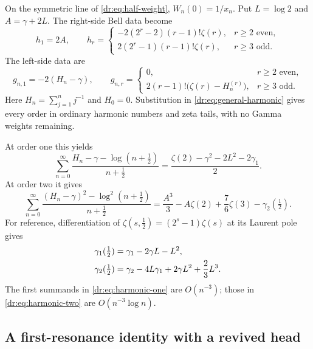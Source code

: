\documentclass[11pt,letterpaper]{article}
\numberwithin{equation}{section}
\theoremstyle{definition}
\theoremstyle{remark}
\begin{document}
On the symmetric line of \eqref{dr:eq:half-weight}, $W_n(0)=1/x_n$.
Put $L=\log2$ and $A=\gamma+2L$. The right-side Bell data become
\begin{equation}
 h_1=2A,\qquad
 h_r=\begin{cases}
 -2(2^r-2)(r-1)!\zeta(r),&r\geq2\text{ even},\\
  2(2^r-1)(r-1)!\zeta(r),&r\geq3\text{ odd}.
 \end{cases}
 \label{dr:eq:half-h}
\end{equation}
The left-side data are
\begin{equation}
 g_{n,1}=-2(H_n-\gamma),\qquad
 g_{n,r}=\begin{cases}
 0,&r\geq2\text{ even},\\
 2(r-1)!\bigl(\zeta(r)-H_n^{(r)}\bigr),&r\geq3\text{ odd}.
 \end{cases}
 \label{dr:eq:half-g}
\end{equation}
Here $H_n=\sum_{j=1}^n j^{-1}$ and $H_0=0$. Substitution in
\eqref{dr:eq:general-harmonic} gives every order in ordinary harmonic
numbers and zeta tails, with no Gamma weights remaining.

At order one this yields
\begin{equation}
 \sum_{n=0}^{\infty}
 \frac{H_n-\gamma-\log(n+\tfrac12)}{n+\tfrac12}
 =\frac{\zeta(2)-\gamma^2-2L^2-2\gamma_1}{2}.
 \label{dr:eq:harmonic-one}
\end{equation}
At order two it gives
\begin{equation}
 \sum_{n=0}^{\infty}
 \frac{(H_n-\gamma)^2-\log^2(n+\tfrac12)}{n+\tfrac12}
 =\frac{A^3}{3}-A\zeta(2)+\frac76\zeta(3)-\gamma_2(\tfrac12).
 \label{dr:eq:harmonic-two}
\end{equation}
For reference, differentiation of
$\zeta(s,\tfrac12)=(2^s-1)\zeta(s)$ at its Laurent pole gives
\begin{align}
 \gamma_1(\tfrac12)&=\gamma_1-2\gamma L-L^2,\notag\\
 \gamma_2(\tfrac12)&=\gamma_2-4L\gamma_1+2\gamma L^2+\frac23L^3.
 \label{dr:eq:half-stieltjes}
\end{align}
The first summands in \eqref{dr:eq:harmonic-one} are $O(n^{-3})$;
those in \eqref{dr:eq:harmonic-two} are $O(n^{-3}\log n)$.

\subsection{A first-resonance identity with a revived head}
\end{document}
